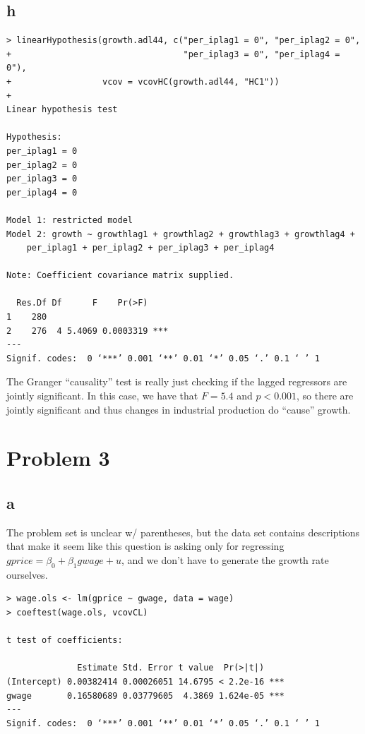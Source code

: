 \documentclass[12pt,letterpaper]{article}
\theoremstyle{definition}
\begin{document}
\subsection*{h}

\begin{Verbatim}[fontsize=\small]
> linearHypothesis(growth.adl44, c("per_iplag1 = 0", "per_iplag2 = 0",
+                                  "per_iplag3 = 0", "per_iplag4 = 0"),
+                  vcov = vcovHC(growth.adl44, "HC1"))
+
Linear hypothesis test

Hypothesis:
per_iplag1 = 0
per_iplag2 = 0
per_iplag3 = 0
per_iplag4 = 0

Model 1: restricted model
Model 2: growth ~ growthlag1 + growthlag2 + growthlag3 + growthlag4 +
    per_iplag1 + per_iplag2 + per_iplag3 + per_iplag4

Note: Coefficient covariance matrix supplied.

  Res.Df Df      F    Pr(>F)
1    280
2    276  4 5.4069 0.0003319 ***
---
Signif. codes:  0 ‘***’ 0.001 ‘**’ 0.01 ‘*’ 0.05 ‘.’ 0.1 ‘ ’ 1
\end{Verbatim}

The Granger ``causality'' test is really just checking if the lagged regressors are jointly significant. In this case, we have that $F = 5.4$ and $p < 0.001$, so there are jointly significant and thus changes in industrial production do ``cause'' growth.

\section*{Problem 3}
\subsection*{a}

The problem set is unclear w/ parentheses, but the data set contains descriptions that make it seem like this question is asking only for regressing $gprice = \beta_{0} + \beta_{1}gwage + u$, and we don't have to generate the growth rate ourselves.

\begin{Verbatim}[fontsize=\small]
> wage.ols <- lm(gprice ~ gwage, data = wage)
> coeftest(wage.ols, vcovCL)

t test of coefficients:

              Estimate Std. Error t value  Pr(>|t|)
(Intercept) 0.00382414 0.00026051 14.6795 < 2.2e-16 ***
gwage       0.16580689 0.03779605  4.3869 1.624e-05 ***
---
Signif. codes:  0 ‘***’ 0.001 ‘**’ 0.01 ‘*’ 0.05 ‘.’ 0.1 ‘ ’ 1
\end{Verbatim}
\end{document}
